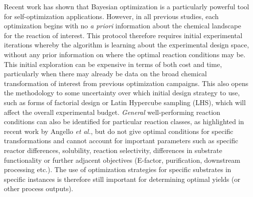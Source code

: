 Recent work has shown that Bayesian optimization is a particularly powerful tool for self-optimization applications.\cite{Amar2019, Schweidtmann2018, Shields2021} However, in all previous studies, each optimization begins with no \textit{a priori} information about the chemical landscape for the reaction of interest. This protocol therefore requires initial experimental iterations whereby the algorithm is learning about the experimental design space, without any prior information on where the optimal reaction conditions may be. This initial exploration can be expensive in terms of both cost and time, particularly when there may already be data on the broad chemical transformation of interest from previous optimization campaigns. This also opens the methodology to some uncertainty over which initial design strategy to use, such as forms of factorial design or Latin Hypercube sampling (LHS), which will affect the overall experimental budget. \textit{General} well-performing reaction conditions can also be identified for particular reaction classes, as highlighted in recent work by Angello \textit{et al.},\cite{Angello2022} but do not give optimal conditions for specific transformations and cannot account for important parameters such as specific reactor differences, solubility, reaction selectivity, differences in substrate functionality or further adjacent objectives (E-factor, purification, downstream processing etc.). The use of optimization strategies for specific substrates in specific instances is therefore still important for determining optimal yields (or other process outputs).

